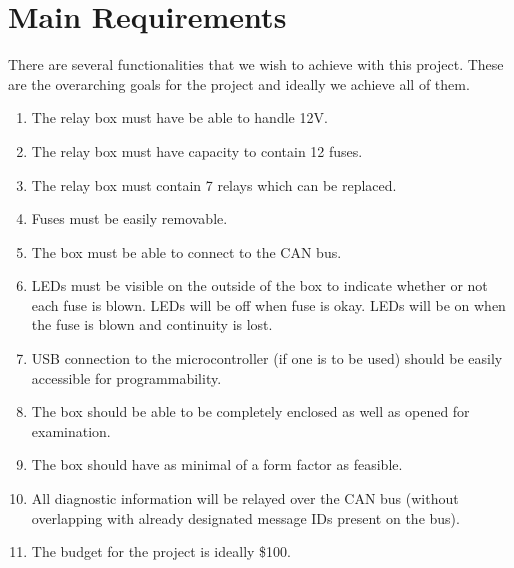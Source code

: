 \documentclass[12pt,letterpaper]{article}
\begin{document}
\section{ Main Requirements }
There are several functionalities that we wish to achieve with this project. These are the overarching goals for the project and ideally we achieve all of them.
\begin{enumerate}
	\item The relay box must have be able to handle 12V.
    \item The relay box must have capacity to contain 12 fuses.
    \item The relay box must contain 7 relays which can be replaced.
    \item Fuses must be easily removable.
    \item The box must be able to connect to the CAN bus.
    \item LEDs must be visible on the outside of the box to indicate whether or not each fuse is blown. LEDs will be off when fuse is okay. LEDs will be on when the fuse is blown and continuity is lost.
    \item USB connection to the microcontroller (if one is to be used) should be easily accessible for programmability. 
    \item The box should be able to be completely enclosed as well as opened for examination.
    \item The box should have as minimal of a form factor as feasible.
    \item All diagnostic information will be relayed over the CAN bus (without overlapping with already designated message IDs present on the bus).
    \item The budget for the project is ideally \$100. 
\end{enumerate} 
\end{document}

